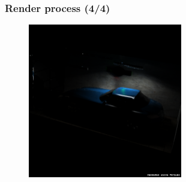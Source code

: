 \documentclass{beamer}
\begin{document}
\begin{frame}
    \frametitle{Render process (4/4)}
    \begin{figure}
        \centering
        \includegraphics[width=0.6\textwidth]{img/SLS/4.png}
    \end{figure}
\end{frame}
\end{document}
